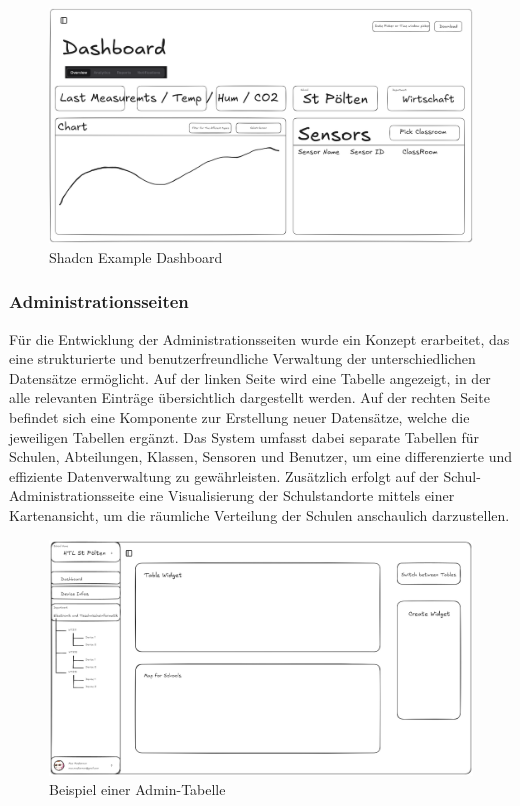 \begin{inhalt}
\begin{figure}[!htb] 
\centering 
\includegraphics[width=1\textwidth]{files/Thomas/pics/Design-Grundlagen/Frontend/Dashboard/Dashboard-Draw.png} 
\caption[Bildbezeichnung für Abbildungsverzeichnis]{Shadcn Example Dashboard} 
\label{fig:gehaeuse_internet_bild} 
\end{figure}

\newpage

\subsubsection{Administrationsseiten}
\label{ref:Administrationsseiten}

Für die Entwicklung der Administrationsseiten wurde ein Konzept erarbeitet, das eine strukturierte und benutzerfreundliche Verwaltung der unterschiedlichen Datensätze ermöglicht. Auf der linken Seite wird eine Tabelle angezeigt, in der alle relevanten Einträge übersichtlich dargestellt werden. Auf der rechten Seite befindet sich eine Komponente zur Erstellung neuer Datensätze, welche die jeweiligen Tabellen ergänzt. Das System umfasst dabei separate Tabellen für Schulen, Abteilungen, Klassen, Sensoren und Benutzer, um eine differenzierte und effiziente Datenverwaltung zu gewährleisten. Zusätzlich erfolgt auf der Schul-Administrationsseite eine Visualisierung der Schulstandorte mittels einer Kartenansicht, um die räumliche Verteilung der Schulen anschaulich darzustellen.


\begin{figure}[!htb] 
\centering 
\includegraphics[width=1\textwidth]{files/Thomas/pics/Design-Grundlagen/Frontend/AdminSeite/AdminSeite-Draw.png} 
\caption[Bildbezeichnung für Abbildungsverzeichnis]{Beispiel einer Admin-Tabelle} 
\label{fig:gehaeuse_internet_bild} 
\end{figure}


\end{inhalt}
